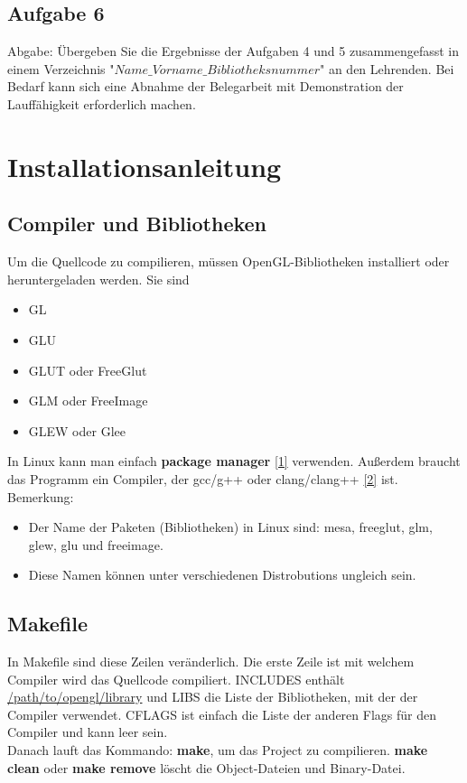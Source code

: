 \documentclass[12pt]{article}
\begin{document}
\subsection{Aufgabe 6}
Abgabe: Übergeben Sie die Ergebnisse der Aufgaben 4 und 5 zusammengefasst in einem Verzeichnis "$Name\_Vorname\_Bibliotheksnummer$" an den Lehrenden. Bei Bedarf kann sich eine Abnahme der Belegarbeit mit Demonstration der Lauffähigkeit erforderlich machen. \\

\pagebreak

\section{Installationsanleitung}

\subsection{Compiler und Bibliotheken}
Um die Quellcode zu compilieren, müssen OpenGL-Bibliotheken installiert oder heruntergeladen werden. Sie sind 

\begin{itemize}
	\item GL 
	\item GLU
	\item GLUT oder FreeGlut
	\item GLM oder FreeImage
	\item GLEW oder Glee
\end{itemize}

In Linux kann man einfach \textbf{package manager} \hyperref[sec:pacman]{[1]} verwenden. Außerdem braucht das Programm ein Compiler, der gcc/g++ oder clang/clang++ \hyperref[sec:comp]{[2]} ist.  \\
Bemerkung:
\begin{itemize}
	\item Der Name der Paketen (Bibliotheken) in Linux sind: mesa, freeglut, glm, glew, glu und freeimage.
	\item Diese Namen können unter verschiedenen Distrobutions ungleich sein.
\end{itemize}

\subsection{Makefile}

In Makefile sind diese Zeilen veränderlich. Die erste Zeile ist mit welchem Compiler wird das Quellcode compiliert. 
INCLUDES enthält \underline{/path/to/opengl/library} und LIBS die Liste der Bibliotheken, mit der der Compiler verwendet. 
CFLAGS ist einfach die Liste der anderen Flags für den Compiler und kann leer sein. \\
Danach lauft das Kommando: \textbf{make}, um das Project zu compilieren. \textbf{make clean} oder \textbf{make remove} löscht die Object-Dateien und Binary-Datei. \\
\end{document}
